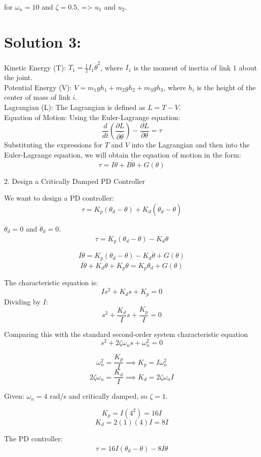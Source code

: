 \documentclass{article}
\begin{document}
for $\omega_n = 10$ and $\zeta = 0.5$, => $u_1$ and $u_2$.

\section{Solution 3:}

Kinetic Energy (T): $T_1 = \frac{1}{2}I_1\dot{\theta}^2$, where $I_1$ is the moment of inertia of link 1 about the joint. \\
Potential Energy (V): $V = m_1 g h_1 + m_2 g h_2 + m_3 g h_3$, where $h_i$ is the height of the center of mass of link $i$.\\
Lagrangian (L): The Lagrangian is defined as $L = T - V$. \\
Equation of Motion: Using the Euler-Lagrange equation:
    \[
    \frac{d}{dt}\left(\frac{\partial L}{\partial \dot{\theta}}\right) - \frac{\partial L}{\partial \theta} = \tau
    \]
    Substituting the expressions for $T$ and $V$ into the Lagrangian and then into the Euler-Lagrange equation, we will obtain the equation of motion in the form:
    \[
    \tau = I\ddot{\theta} + B\dot{\theta} + G(\theta)
    \]

2. Design a Critically Damped PD Controller

We want to design a PD controller:
\[
\tau = K_p (\theta_d - \theta) + K_d (\dot{\theta}_d - \dot{\theta})
\]

$\dot{\theta}_d = 0$ and $\ddot{\theta}_d = 0$.  
\[
\tau = K_p (\theta_d - \theta) - K_d \dot{\theta}
\]

\[
I\ddot{\theta} = K_p (\theta_d - \theta) - K_d \dot{\theta} + G(\theta)
\]
\[
I\ddot{\theta} + K_d \dot{\theta} + K_p \theta = K_p \theta_d + G(\theta)
\]

The characteristic equation is:
\[
Is^2 + K_d s + K_p = 0
\]
Dividing by $I$:
\[
s^2 + \frac{K_d}{I} s + \frac{K_p}{I} = 0
\]

Comparing this with the standard second-order system characteristic equation
\[
s^2 + 2\zeta\omega_n s + \omega_n^2 = 0
\]

\[
\omega_n^2 = \frac{K_p}{I} \implies K_p = I\omega_n^2
\]
\[
2\zeta\omega_n = \frac{K_d}{I} \implies K_d = 2\zeta\omega_n I
\]

Given: $\omega_n = 4$ rad/s and critically damped, so $\zeta = 1$.

\[
K_p = I (4^2) = 16I
\]
\[
K_d = 2 (1) (4) I = 8I
\]

The PD controller:
\[
\tau = 16I (\theta_d - \theta) - 8I \dot{\theta}
\]
\end{document}
